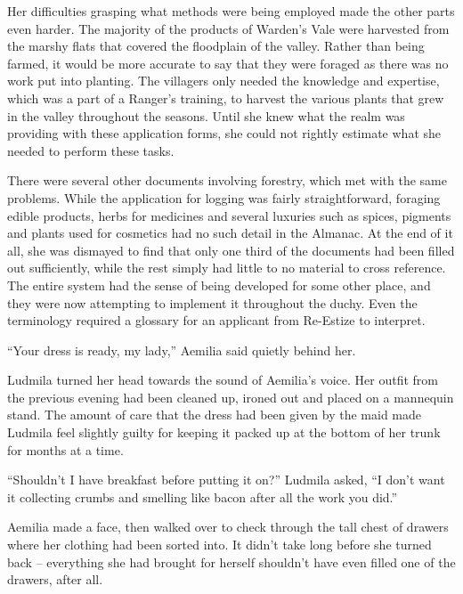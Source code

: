  

Her difficulties grasping what methods were being employed made the other parts even harder. The majority of the products of Warden’s Vale were harvested from the marshy flats that covered the floodplain of the valley. Rather than being farmed, it would be more accurate to say that they were foraged as there was no work put into planting. The villagers only needed the knowledge and expertise, which was a part of a Ranger's training, to harvest the various plants that grew in the valley throughout the seasons. Until she knew what the realm was providing with these application forms, she could not rightly estimate what she needed to perform these tasks.

 

There were several other documents involving forestry, which met with the same problems. While the application for logging was fairly straightforward, foraging edible products, herbs for medicines and several luxuries such as spices, pigments and plants used for cosmetics had no such detail in the Almanac. At the end of it all, she was dismayed to find that only one third of the documents had been filled out sufficiently, while the rest simply had little to no material to cross reference. The entire system had the sense of being developed for some other place, and they were now attempting to implement it throughout the duchy. Even the terminology required a glossary for an applicant from Re-Estize to interpret.

 

“Your dress is ready, my lady,” Aemilia said quietly behind her.

 

Ludmila turned her head towards the sound of Aemilia’s voice. Her outfit from the previous evening had been cleaned up, ironed out and placed on a mannequin stand. The amount of care that the dress had been given by the maid made Ludmila feel slightly guilty for keeping it packed up at the bottom of her trunk for months at a time.

 

“Shouldn’t I have breakfast before putting it on?” Ludmila asked, “I don’t want it collecting crumbs and smelling like bacon after all the work you did.”

 

Aemilia made a face, then walked over to check through the tall chest of drawers where her clothing had been sorted into. It didn’t take long before she turned back – everything she had brought for herself shouldn’t have even filled one of the drawers, after all.

